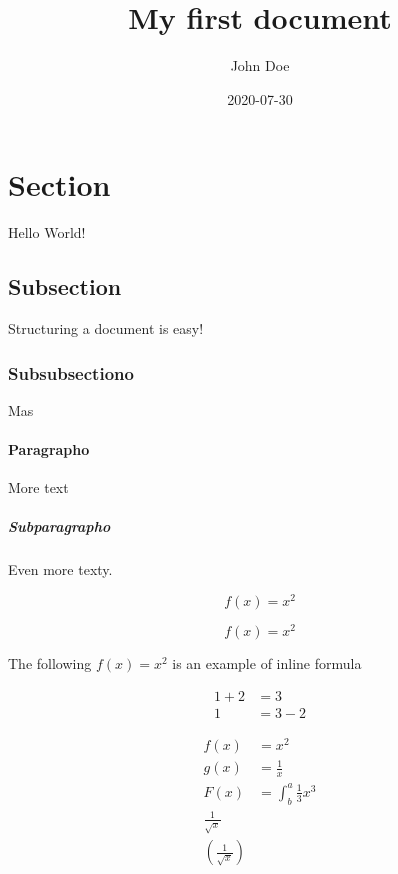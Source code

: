 \documentclass{article}
\title{My first document}
\date{2020-07-30}
\author{John Doe}
\begin{document}
	\maketitle
	\newpage

	\section{Section}
	
		Hello World!
	
	\subsection{Subsection}
		
		Structuring a document is easy!

	\subsubsection{Subsubsectiono}
	
		Mas

	\paragraph{Paragrapho}

		More text

	\subparagraph{Subparagrapho}

		Even more texty.


	\begin{equation}
		f(x) = x^2
	\end{equation}


	\begin{equation*}
		f(x) = x^2
	\end{equation*}

	
	The following $f(x) = x^2$ is an example of inline formula
	
	\begin{align*}
		1 + 2 &= 3\\
		1 &= 3 - 2
	\end{align*}

	\begin{align*}
		f(x) &= x^2\\
		g(x) &= \frac{1}{x}\\
		F(x) &= \int^a_b \frac{1}{3}x^3\\
		\frac{1}{\sqrt{x}}\\
		\left(\frac{1}{\sqrt{x}}\right)
	\end{align*}
\end{document}
